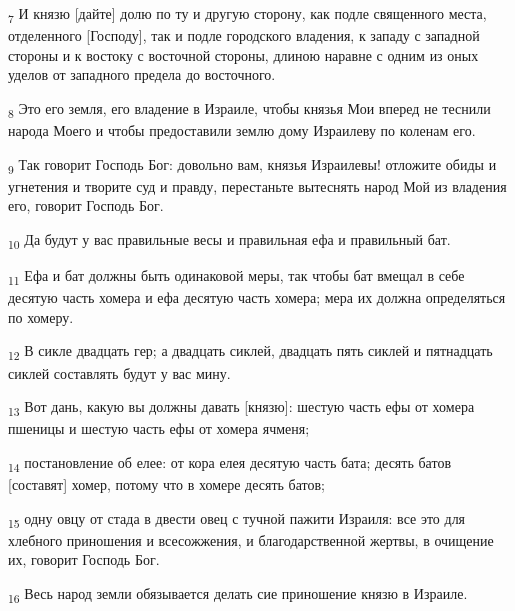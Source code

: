 \begin{tcolorbox}
\textsubscript{7} И князю [дайте] долю по ту и другую сторону, как подле священного места, отделенного [Господу], так и подле городского владения, к западу с западной стороны и к востоку с восточной стороны, длиною наравне с одним из оных уделов от западного предела до восточного.
\end{tcolorbox}
\begin{tcolorbox}
\textsubscript{8} Это его земля, его владение в Израиле, чтобы князья Мои вперед не теснили народа Моего и чтобы предоставили землю дому Израилеву по коленам его.
\end{tcolorbox}
\begin{tcolorbox}
\textsubscript{9} Так говорит Господь Бог: довольно вам, князья Израилевы! отложите обиды и угнетения и творите суд и правду, перестаньте вытеснять народ Мой из владения его, говорит Господь Бог.
\end{tcolorbox}
\begin{tcolorbox}
\textsubscript{10} Да будут у вас правильные весы и правильная ефа и правильный бат.
\end{tcolorbox}
\begin{tcolorbox}
\textsubscript{11} Ефа и бат должны быть одинаковой меры, так чтобы бат вмещал в себе десятую часть хомера и ефа десятую часть хомера; мера их должна определяться по хомеру.
\end{tcolorbox}
\begin{tcolorbox}
\textsubscript{12} В сикле двадцать гер; а двадцать сиклей, двадцать пять сиклей и пятнадцать сиклей составлять будут у вас мину.
\end{tcolorbox}
\begin{tcolorbox}
\textsubscript{13} Вот дань, какую вы должны давать [князю]: шестую часть ефы от хомера пшеницы и шестую часть ефы от хомера ячменя;
\end{tcolorbox}
\begin{tcolorbox}
\textsubscript{14} постановление об елее: от кора елея десятую часть бата; десять батов [составят] хомер, потому что в хомере десять батов;
\end{tcolorbox}
\begin{tcolorbox}
\textsubscript{15} одну овцу от стада в двести овец с тучной пажити Израиля: все это для хлебного приношения и всесожжения, и благодарственной жертвы, в очищение их, говорит Господь Бог.
\end{tcolorbox}
\begin{tcolorbox}
\textsubscript{16} Весь народ земли обязывается делать сие приношение князю в Израиле.
\end{tcolorbox}
